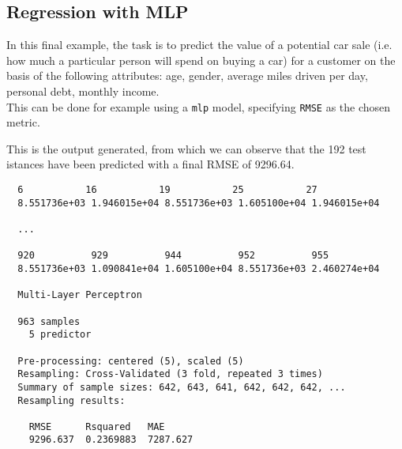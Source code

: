 \documentclass{article}
\begin{document}
\pagebreak

\subsection{Regression with MLP}
In this final example, the task is to predict the value of a potential car sale (i.e. how much a particular person will spend on buying a car) for a customer on the basis of the following attributes: age, gender, average miles driven per day, personal debt, monthly income.\\

This can be done for example using a \texttt{mlp} model, specifying \texttt{RMSE} as the chosen metric.\\



\pagebreak

This is the output generated, from which we can observe that the 192 test istances have been predicted with a final RMSE of 9296.64.\\

\begin{lstlisting}
  6           16           19           25           27           
  8.551736e+03 1.946015e+04 8.551736e+03 1.605100e+04 1.946015e+04 

  ...

  920          929          944          952          955 
  8.551736e+03 1.090841e+04 1.605100e+04 8.551736e+03 2.460274e+04 

  Multi-Layer Perceptron 
  
  963 samples
    5 predictor
  
  Pre-processing: centered (5), scaled (5) 
  Resampling: Cross-Validated (3 fold, repeated 3 times) 
  Summary of sample sizes: 642, 643, 641, 642, 642, 642, ... 
  Resampling results:
  
    RMSE      Rsquared   MAE     
    9296.637  0.2369883  7287.627
\end{lstlisting}

\pagebreak

\renewcommand\refname{References}

\end{document}
